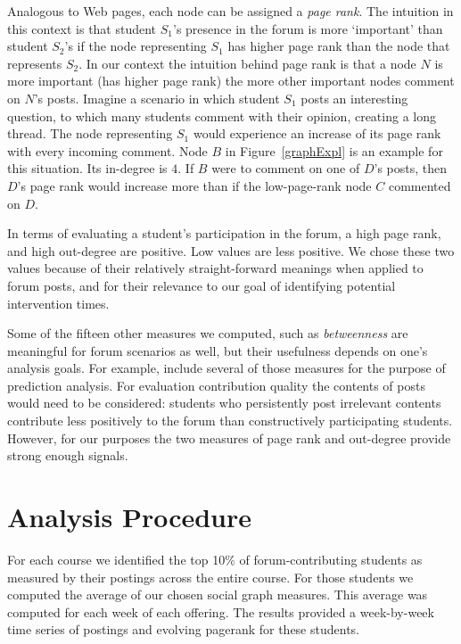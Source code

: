 Analogous to Web pages, each node can be assigned a {\em page
  rank}. The intuition in this context is that student $S_1$'s
presence in the forum is more `important' than student $S_2$'s if the
node representing $S_1$ has higher page rank than the node that
represents $S_2$. In our context the intuition behind page rank is
that a node $N$ is more important (has higher page rank) the more
other important nodes comment on $N$'s posts. Imagine a scenario
in which student $S_1$ posts an interesting question, to which many
students comment with their opinion, creating a long thread. The node
representing $S_1$ would experience an increase of its page rank with
every incoming comment. Node $B$ in Figure~\ref{graphExpl} is an
example for this situation. Its in-degree is $4$. If $B$ were to
comment on one of $D$'s posts, then $D$'s page rank would increase
more than if the low-page-rank node $C$ commented on $D$.

In terms of evaluating a student's participation in the forum, a high
page rank, and high out-degree are positive. Low values are less
positive. We chose these two values because of their relatively
straight-forward meanings when applied to forum posts, and for their
relevance to our goal of identifying potential intervention times.

Some of the fifteen other measures we computed, such as {\em
  betweenness} are meaningful for forum scenarios as well, but their
usefulness depends on one's analysis goals. For example,
\cite{yang2013} include several of those measures for the purpose of
prediction analysis. For evaluation contribution quality the contents
of posts would need to be considered: students who persistently post
irrelevant contents contribute less positively to the forum than
constructively participating students. However, for our purposes the
two measures of page rank and out-degree provide strong enough
signals.

\section{Analysis Procedure}

For each course we identified the top 10\% of forum-contributing
students as measured by their postings across the entire course. For
those students we computed the average of our chosen social graph
measures. This average was computed for each week of each
offering. The results provided a week-by-week time series of postings
and evolving pagerank for these students.

